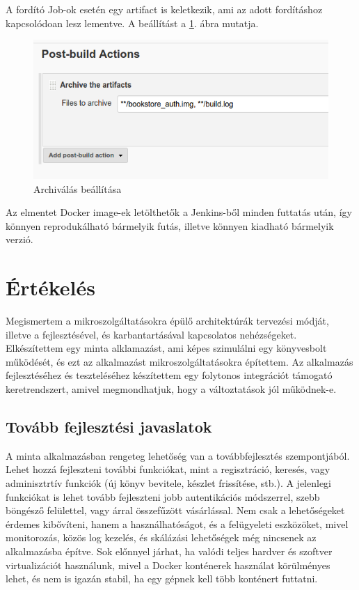 \documentclass[11pt,magyar,a4paper,twoside,]{report}
\let\Oldincludegraphics\includegraphics
\renewcommand{\includegraphics}[1]{
\begin{adjustbox}{max size={\textwidth}{\textheight}}
    \Oldincludegraphics[scale=0.6]{#1}%
\end{adjustbox}
}
\begin{document}
A fordító Job-ok esetén egy artifact is keletkezik, ami az adott
fordításhoz kapcsolódoan lesz lementve. A beállítást a \ref{archive}.
ábra mutatja.

\begin{figure}[H]
\centering
\includegraphics{img/archive.png}
\caption{Archiválás beállítása\label{archive}}
\end{figure}

Az elmentet Docker image-ek letölthetők a Jenkins-ből minden futtatás
után, így könnyen reprodukálható bármelyik futás, illetve könnyen
kiadható bármelyik verzió.

\chapter{Értékelés}\label{uxe9rtuxe9keluxe9s}

Megismertem a mikroszolgáltatásokra épülő architektúrák tervezési
módját, illetve a fejlesztésével, és karbantartásával kapcsolatos
nehézségeket. Elkészítettem egy minta alklamazást, ami képes szimulálni
egy könyvesbolt működését, és ezt az alkalmazást mikroszolgáltatásokra
építettem. Az alkalmazás fejlesztéséhez és teszteléséhez készítettem egy
folytonos integrációt támogató keretrendszert, amivel megmondhatjuk,
hogy a változtatások jól működnek-e.

\section{Tovább fejlesztési
javaslatok}\label{tovuxe1bb-fejlesztuxe9si-javaslatok}

A minta alkalmazásban rengeteg lehetőség van a továbbfejlesztés
szempontjából. Lehet hozzá fejleszteni további funkciókat, mint a
regisztráció, keresés, vagy adminisztrtív funkciók (új könyv bevitele,
készlet frissítése, stb.). A jelenlegi funkciókat is lehet tovább
fejleszteni jobb autentikációs módszerrel, szebb böngésző felülettel,
vagy árral összefűzött vásárlással. Nem csak a lehetőségeket érdemes
kibővíteni, hanem a használhatóságot, és a felügyeleti eszközöket, mivel
monitorozás, közös log kezelés, és skálázási lehetőségek még nincsenek
az alkalmazásba építve. Sok előnnyel járhat, ha valódi teljes hardver és
szoftver virtualizációt használunk, mivel a Docker konténerek használat
körülményes lehet, és nem is igazán stabil, ha egy gépnek kell több
konténert futtatni.
\end{document}
